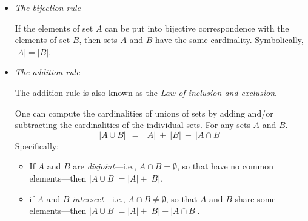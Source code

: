 \begin{itemize}
\item
{\it The bijection rule}

\smallskip

If the elements of set $A$ can be put into bijective correspondence with the elements of set
$B$, then sets $A$ and $B$ have the same cardinality.  Symbolically, $|A| = |B|$.

\item
{\it The addition rule} 

The addition rule is also known as the {\it Law of inclusion and exclusion}.

\smallskip

One can compute the cardinalities of unions of sets by adding and/or subtracting
the cardinalities of the individual sets.  For any sets $A$ and $B$.
\[ |A \cup B| \ \ = \ \ |A|  \ + \ |B| \ - \ |A \cap B| \]
Specifically:
  \begin{itemize}
  \item
If $A$ and $B$ are {\em disjoint}---i.e., $A \cap B = \emptyset$, so that
have no common elements---then $|A \cup B| = |A| + |B|$.

 \item
if $A$ and $B$ {\em intersect}---i.e., $A \cap B \neq \emptyset$, so that $A$ and
$B$ share some elements---then $|A \cup B|  =  |A|  + |B| - |A \cap B|$.


\end{itemize}
\end{itemize}
